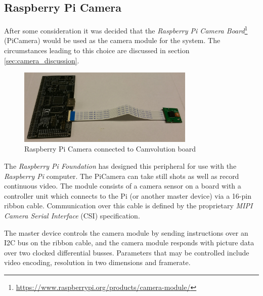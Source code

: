 \subsection{Raspberry Pi Camera}
After some consideration it was decided that the \textit{Raspberry Pi Camera Board}\footnote{\url{https://www.raspberrypi.org/products/camera-module/}} (PiCamera) would be used as the camera module for the system.
The circumstances leading to this choice are discussed in section \ref{sec:camera_discussion}.

\begin{figure}[h]
    \centering
    \includegraphics[width=0.75\textwidth]{img/picamera}
    \caption{Raspberry Pi Camera connected to Camvolution board}
\end{figure}

The \textit{Raspberry Pi Foundation} has designed this peripheral for use with the \textit{Raspberry Pi} computer.
The PiCamera can take still shots as well as record continuous video.
The module consists of a camera sensor on a board with a controller unit which connects to the Pi (or another master device) via a 16-pin ribbon cable.
Communication over this cable is defined by the proprietary \textit{MIPI Camera Serial Interface} (CSI) specification.

The master device controls the camera module by sending instructions over an I2C bus on the ribbon cable,
and the camera module responds with picture data over two clocked differential busses.\cite{picam-pinout}
Parameters that may be controlled include video encoding, resolution in two dimensions and framerate.

